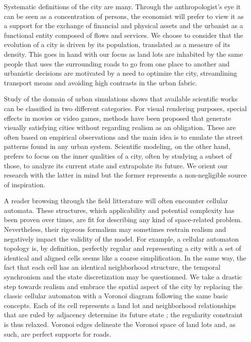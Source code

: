 \documentclass[12pt]{article}
\begin{document}
Systematic definitions of the city are many. Through the
anthropologist's eye it can be seen as a concentration of persons, the
economist will prefer to view it as a support for the exchange of
financial and physical assets and the urbanist as a functional entity
composed of flows and services. We choose to consider that the
evolution of a city is driven by its population, translated as a
measure of its density. This goes in hand with our focus as land lots
are inhabited by the same people that uses the surrounding roads to go
from one place to another and urbanistic decisions are motivated by a
need to optimize the city, streamlining transport means and avoiding
high contrasts in the urban fabric.

Study of the domain of urban simulations shows that available
scientific works can be classified in two different categories. For
visual rendering purposes, special effects in movies or video games,
methods have been proposed that generate visually satisfying cities
without regarding realism as an obligation. These are often based on
empirical observations and the main idea is to emulate the street
patterns found in any urban system. Scientific modeling, on the other
hand, prefers to focus on the inner qualities of a city, often by
studying a subset of those, to analyze its current state and
extrapolate its future. We orient our research with the latter in mind
but the former represents a non-negligible source of inspiration.

A reader browsing through the field litterature will often encounter
cellular automata. These structures, which applicability and potential
complexity has been proven over times, are fit for describing any kind
of space-related problem. Nevertheless, their rigorous formalism may
sometimes restrain realism and negatively impact the validity of the
model. For example, a cellular automaton topology is, by definition,
perfectly regular and representing a city with a set of identical and
aligned cells seems like a coarse simplification. In the same way, the
fact that each cell has an identical neighborhood structure, the
temporal synchronism and the state discretization may be
questionned. We take a drastic step towards realism and embrace the
spatial aspect of the city by replacing the classic cellular automaton
with a Voronoï diagram following the same basic concepts. Each of its
cell represents a land lot and neighborhood relationships that are
ruled by adjacency determine its future state ; the regularity
constraint is thus relaxed. Voronoi edges delineate the Voronoi space
of land lots and, as such, are perfect supports for roads.
\end{document}
